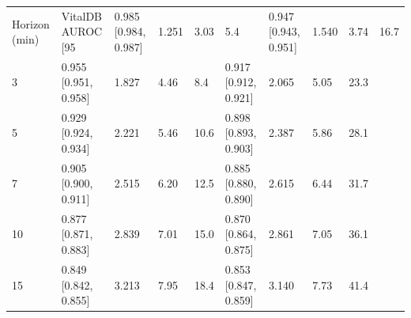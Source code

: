 \begin{tabular}{lllllllll}
\hline
Horizon (min) & VitalDB AUROC [95%
 & 0.985 [0.984, 0.987] & 1.251 & 3.03 & 5.4 & 0.947 [0.943, 0.951] & 1.540 & 3.74 & 16.7 \\
3 & 0.955 [0.951, 0.958] & 1.827 & 4.46 & 8.4 & 0.917 [0.912, 0.921] & 2.065 & 5.05 & 23.3 \\
5 & 0.929 [0.924, 0.934] & 2.221 & 5.46 & 10.6 & 0.898 [0.893, 0.903] & 2.387 & 5.86 & 28.1 \\
7 & 0.905 [0.900, 0.911] & 2.515 & 6.20 & 12.5 & 0.885 [0.880, 0.890] & 2.615 & 6.44 & 31.7 \\
10 & 0.877 [0.871, 0.883] & 2.839 & 7.01 & 15.0 & 0.870 [0.864, 0.875] & 2.861 & 7.05 & 36.1 \\
15 & 0.849 [0.842, 0.855] & 3.213 & 7.95 & 18.4 & 0.853 [0.847, 0.859] & 3.140 & 7.73 & 41.4 \\
\hline
\end{tabular}
